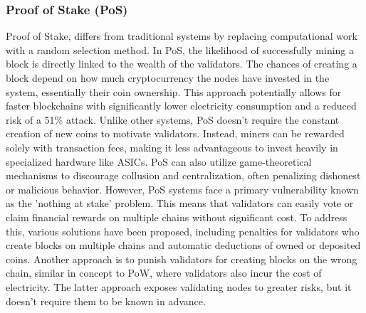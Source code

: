\subsubsection{Proof of Stake (PoS)}
Proof of Stake, differs from traditional systems by replacing computational work with a random selection method. In PoS, the likelihood of successfully mining a block is
directly linked to the wealth of the validators. The chances of creating a block depend on how much cryptocurrency the nodes have invested in the system, essentially their
coin ownership. This approach potentially allows for faster blockchains with significantly lower electricity consumption and a reduced risk of a 51\% attack.
Unlike other systems, PoS doesn't require the constant creation of new coins to motivate validators. Instead, miners can be rewarded solely with transaction fees, making it
less advantageous to invest heavily in specialized hardware like ASICs.
PoS can also utilize game-theoretical mechanisms to discourage collusion and centralization, often penalizing dishonest or malicious behavior. However, PoS systems face a
primary vulnerability known as the 'nothing at stake' problem. This means that validators can easily vote or claim financial rewards on multiple chains without significant cost.
To address this, various solutions have been proposed, including penalties for validators who create blocks on multiple chains and automatic deductions of owned or deposited
coins. Another approach is to punish validators for creating blocks on the wrong chain, similar in concept to PoW, where validators also incur the cost of electricity.
The latter approach exposes validating nodes to greater risks, but it doesn't require them to be known in advance.
\cite{andoni2019blockchain}

